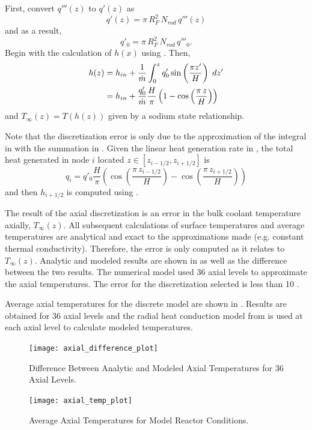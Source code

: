     First, convert $q'''(z)$ to $q'(z)$ as
    \begin{equation}
      \label{eq:qprime}
      q'(z) = \pi \, R_F^2 \, N_{rod} \, q'''(z)
    \end{equation}
    and as a result,
    \begin{equation}
      q'_0 = \pi \, R_F^2 \, N_{rod} \, q'''_0.
    \end{equation}
    Begin with the calculation of $h(x)$ using 
    . Then,
    \begin{align}
      h(z) &= h_{in} + \frac{1}{\dot{m}} 
        \int_0^z q'_0 \sin\left(\frac{\pi z'}{H}\right)\;dz' \\
      &= h_{in} + \frac{q'_0}{\dot{m}} \frac{H}{\pi}
        \left(1 - \cos\left(\frac{\pi \, z}{H}\right)\right)
    \end{align}
    and $T_{\infty}(z) = T(h(z))$ given by a sodium state relationship.

    Note that the discretization error is only due to the approximation of the
    integral in  with the summation in 
    . Given the linear heat generation rate in
    , the total heat generated in node $i$ located 
    ${z \in [z_{i-1/2},z_{i+1/2}]}$ is 
    \begin{equation}
      q_i = q'_0 \frac{H}{\pi} \left( \cos\left(\frac{\pi \,
      z_{i-1/2}}{H}\right) - \cos\left(\frac{\pi \, z_{i+1/2}}{H}\right)
      \right)
    \end{equation}
    and then $h_{i+1/2}$ is computed using .
    
    The result of the axial discretization is an error in the bulk coolant
    temperature axially, $T_{\infty}(z)$. All subsequent calculations of surface
    temperatures and average temperatures are analytical and exact to the
    approximations made (e.g. constant thermal conductivity). Therefore, the
    error is only computed as it relates to $T_{\infty}(z)$. Analytic and
    modeled results are shown in  as well as the
    difference between the two results. The numerical model used 36 axial levels
    to approximate the axial temperatures. The error for the discretization
    selected is less than 10 . 
    
    Average axial temperatures for the discrete model 
    are shown in . Results are obtained for 36 axial
    levels and the radial heat conduction model from  is
    used at each axial level to calculate modeled temperatures.

    \begin{figure}
      \centering
      \texttt{[image: axial\_difference\_plot]}
      \caption{Difference Between Analytic and Modeled Axial Temperatures for 36
        Axial Levels.}
      \label{fig:axial_difference_plot}
    \end{figure}

    \begin{figure}
      \centering
      \texttt{[image: axial\_temp\_plot]}
      \caption{Average Axial Temperatures for Model Reactor Conditions.}
      \label{fig:axial_temp_plot}
    \end{figure}
